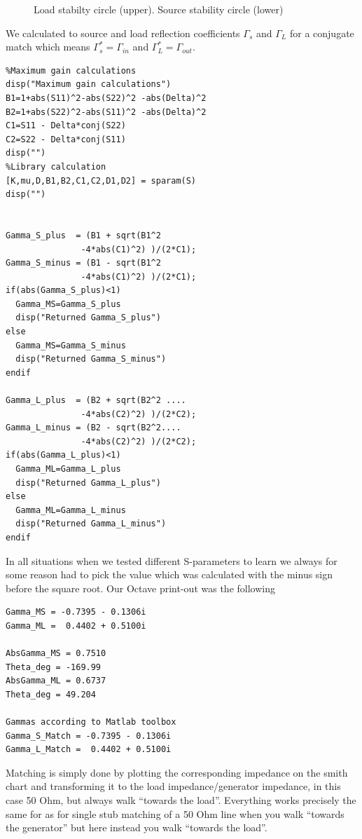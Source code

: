 \documentclass{article}
\begin{document}
\begin{multicols}{2}
\begin{figure}[H]
  \caption{Load stabilty circle (upper). Source stability circle (lower)}
  \label{fig4}
\end{figure}
We calculated to source and load reflection coefficients $\Gamma_s$ and $\Gamma_L$
for a conjugate match which means $\Gamma_s^* = \Gamma_{in}$ and $\Gamma_L^*= \Gamma_{out}$.

\begin{verbatim}
%Maximum gain calculations
disp("Maximum gain calculations")
B1=1+abs(S11)^2-abs(S22)^2 -abs(Delta)^2
B2=1+abs(S22)^2-abs(S11)^2 -abs(Delta)^2
C1=S11 - Delta*conj(S22)
C2=S22 - Delta*conj(S11)
disp("")
%Library calculation
[K,mu,D,B1,B2,C1,C2,D1,D2] = sparam(S)
disp("")


Gamma_S_plus  = (B1 + sqrt(B1^2 
               -4*abs(C1)^2) )/(2*C1);
Gamma_S_minus = (B1 - sqrt(B1^2 
               -4*abs(C1)^2) )/(2*C1);
if(abs(Gamma_S_plus)<1)
  Gamma_MS=Gamma_S_plus
  disp("Returned Gamma_S_plus")
else
  Gamma_MS=Gamma_S_minus
  disp("Returned Gamma_S_minus")
endif

Gamma_L_plus  = (B2 + sqrt(B2^2 ....
               -4*abs(C2)^2) )/(2*C2);
Gamma_L_minus = (B2 - sqrt(B2^2....
               -4*abs(C2)^2) )/(2*C2);
if(abs(Gamma_L_plus)<1)
  Gamma_ML=Gamma_L_plus
  disp("Returned Gamma_L_plus")
else
  Gamma_ML=Gamma_L_minus
  disp("Returned Gamma_L_minus")
endif
\end{verbatim}
In all situations when we tested different S-parameters to learn we always
for some reason had to pick the value which was calculated
with the minus sign before the square root.
Our Octave print-out was the following
\begin{verbatim}
Gamma_MS = -0.7395 - 0.1306i
Gamma_ML =  0.4402 + 0.5100i

AbsGamma_MS = 0.7510
Theta_deg = -169.99
AbsGamma_ML = 0.6737
Theta_deg = 49.204

Gammas according to Matlab toolbox
Gamma_S_Match = -0.7395 - 0.1306i
Gamma_L_Match =  0.4402 + 0.5100i
\end{verbatim}
Matching is simply done by plotting the corresponding impedance on the smith chart
and transforming it to the load impedance/generator impedance, in this case 50 Ohm, but always walk ``towards the load''.
Everything works precisely the same for as for single stub matching of a 50 Ohm line when you walk ``towards the generator''
but here instead you walk ``towards the load''.


\end{multicols}
\end{document}
